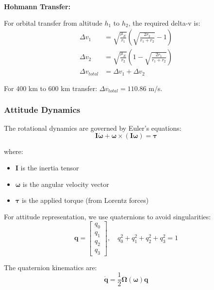 \documentclass[12pt,a4paper]{article}
\begin{document}
\textbf{Hohmann Transfer:}

For orbital transfer from altitude $h_1$ to $h_2$, the required delta-v is:
\begin{align}
\Delta v_1 &= \sqrt{\frac{\mu_E}{r_1}} \left(\sqrt{\frac{2r_2}{r_1 + r_2}} - 1\right) \\
\Delta v_2 &= \sqrt{\frac{\mu_E}{r_2}} \left(1 - \sqrt{\frac{2r_1}{r_1 + r_2}}\right) \\
\Delta v_{total} &= \Delta v_1 + \Delta v_2
\label{eq:hohmann}
\end{align}

For 400 km to 600 km transfer: $\Delta v_{total} = 110.86$ m/s.

\subsubsection{Attitude Dynamics}

The rotational dynamics are governed by Euler's equations:
\begin{equation}
\mathbf{I}\dot{\boldsymbol{\omega}} + \boldsymbol{\omega} \times (\mathbf{I}\boldsymbol{\omega}) = \boldsymbol{\tau}
\label{eq:euler_rotation}
\end{equation}

where:
\begin{itemize}
\item $\mathbf{I}$ is the inertia tensor
\item $\boldsymbol{\omega}$ is the angular velocity vector
\item $\boldsymbol{\tau}$ is the applied torque (from Lorentz forces)
\end{itemize}

For attitude representation, we use quaternions to avoid singularities:
\begin{equation}
\mathbf{q} = \begin{bmatrix} q_0 \\ q_1 \\ q_2 \\ q_3 \end{bmatrix}, \quad q_0^2 + q_1^2 + q_2^2 + q_3^2 = 1
\label{eq:quaternion}
\end{equation}

The quaternion kinematics are:
\begin{equation}
\dot{\mathbf{q}} = \frac{1}{2}\boldsymbol{\Omega}(\boldsymbol{\omega})\mathbf{q}
\label{eq:quaternion_kinematics}
\end{equation}
\end{document}

